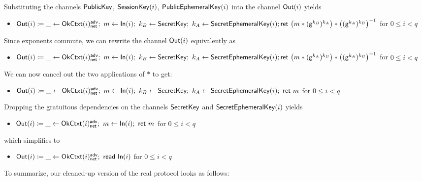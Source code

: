 \noindent Substituting the channels $\mathsf{PublicKey}$, $\mathsf{SessionKey}(i)$, $\mathsf{PublicEphemeralKey}(i)$ into the channel $\mathsf{Out}(i)$ yields
\begin{itemize}
\item $\mathsf{Out}(i) \coloneqq \_ \leftarrow \mathsf{OkCtxt}(i)^{\mathsf{adv}}_{\mathsf{net}}; \ m \leftarrow \mathsf{In}(i); \ k_B \leftarrow \mathsf{SecretKey}; \ k_A \leftarrow \mathsf{SecretEphemeralKey}(i); \\ \mathsf{ret} \ \big(m * (\mathsf{g}^{k_B})^{k_A}\big) * \big((\mathsf{g}^{k_A})^{k_B}\big)^{-1}$ for $0 \leq i < q$
\end{itemize}
Since exponents commute, we can rewrite the channel $\mathsf{Out}(i)$ equivalently as
\begin{itemize}
\item $\mathsf{Out}(i) \coloneqq \_ \leftarrow \mathsf{OkCtxt}(i)^{\mathsf{adv}}_{\mathsf{net}}; \ m \leftarrow \mathsf{In}(i); \ k_B \leftarrow \mathsf{SecretKey}; \ k_A \leftarrow \mathsf{SecretEphemeralKey}(i); \\ \mathsf{ret} \ \big(m * (\mathsf{g}^{k_A})^{k_B}\big) * \big((\mathsf{g}^{k_A})^{k_B}\big)^{-1}$ for $0 \leq i < q$
\end{itemize}
We can now cancel out the two applications of $*$ to get:
\begin{itemize}
\item $\mathsf{Out}(i) \coloneqq \_ \leftarrow \mathsf{OkCtxt}(i)^{\mathsf{adv}}_{\mathsf{net}}; \ m \leftarrow \mathsf{In}(i); \ k_B \leftarrow \mathsf{SecretKey}; \ k_A \leftarrow \mathsf{SecretEphemeralKey}(i); \ \mathsf{ret} \ m$ for $0 \leq i < q$
\end{itemize}
Dropping the gratuitous dependencies on the channels $\mathsf{SecretKey}$ and $\mathsf{SecretEphemeralKey}(i)$ yields
\begin{itemize}
\item $\mathsf{Out}(i) \coloneqq \_ \leftarrow \mathsf{OkCtxt}(i)^{\mathsf{adv}}_{\mathsf{net}}; \ m \leftarrow \mathsf{In}(i); \ \mathsf{ret} \ m$ for $0 \leq i < q$
\end{itemize}
which simplifies to
\begin{itemize}
\item $\mathsf{Out}(i) \coloneqq \_ \leftarrow \mathsf{OkCtxt}(i)^{\mathsf{adv}}_{\mathsf{net}}; \ \mathsf{read} \ \mathsf{In}(i)$ for $0 \leq i < q$
\end{itemize}

\noindent To summarize, our cleaned-up version of the real protocol looks as follows:

